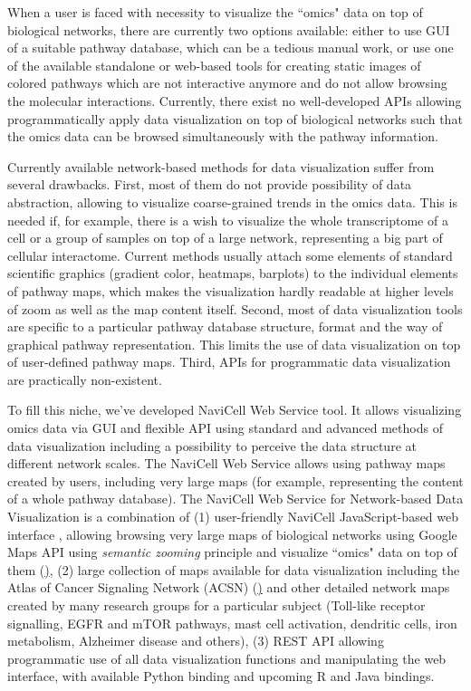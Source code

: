 \documentclass[a4,center,fleqn]{NAR}
\begin{document}
When a user is faced with necessity to visualize the ``omics" data on top of biological networks, there are currently two options available: either to use GUI of a suitable pathway database, which can be a tedious manual work, or use one of the available standalone or web-based tools for creating static images of colored pathways which are not interactive anymore and do not allow browsing the molecular interactions. Currently, there exist no well-developed APIs allowing programmatically apply data visualization on top of biological networks such that the omics data can be browsed simultaneously with the pathway information.

Currently available network-based methods for data visualization suffer from several drawbacks. First, most of them do not provide possibility of data abstraction, allowing to visualize coarse-grained trends in the omics data. This is needed if, for example, there is a wish to visualize the whole transcriptome of a cell or a group of samples on top of a large network, representing a big part of cellular interactome. Current methods usually attach some elements of standard scientific graphics (gradient color, heatmaps, barplots) to the individual elements of pathway maps, which makes the visualization hardly readable at higher levels of zoom as well as the map content itself. Second, most of data visualization tools are specific to a particular pathway database structure, format and the way of graphical pathway representation. This limits the use of data visualization on top of user-defined pathway maps. Third, APIs for programmatic data visualization are practically non-existent.

To fill this niche, we've developed NaviCell Web Service tool. It allows visualizing omics data via GUI and flexible API using standard and advanced methods of data visualization including a possibility to perceive the data structure at different network scales. The NaviCell Web Service allows using pathway maps created by users, including very large maps (for example, representing the content of a whole pathway database). The NaviCell Web Service for Network-based Data Visualization is a combination of (1) user-friendly NaviCell JavaScript-based web interface \cite{kuperstein2013navicell}, allowing browsing very large maps of biological networks using Google Maps API using \emph{semantic zooming} principle and visualize ``omics" data on top of them (\href{http://navicell.curie.fr}), (2) large collection of maps available for data visualization including the Atlas of Cancer Signaling Network (ACSN) (\href{http://acsn.curie.fr}) and other detailed network maps created by many research groups for a particular subject (Toll-like receptor signalling, EGFR and mTOR pathways, mast cell activation, dendritic cells, iron metabolism, Alzheimer disease and others), (3) REST API allowing programmatic use of all data visualization functions and manipulating the web interface, with available Python binding and upcoming R and Java bindings.
\end{document}

